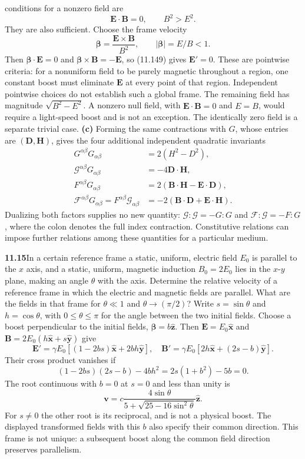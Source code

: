 conditions for a nonzero field are
\[
\boxed{\mathbf E\cdot\mathbf B=0,\qquad B^2>E^2.}
\]
They are also sufficient. Choose the frame velocity
\[
\boldsymbol\beta=\frac{\mathbf E\times\mathbf B}{B^2},
\qquad |\boldsymbol\beta|=E/B<1.
\]
Then $\boldsymbol\beta\cdot\mathbf E=0$ and
$\boldsymbol\beta\times\mathbf B=-\mathbf E$, so (11.149)
gives $\mathbf E'=0$.  These are pointwise criteria: for a
nonuniform field to be purely magnetic throughout a region, one
constant boost must eliminate $\mathbf E$ at every point of that
region.  Independent pointwise choices do not establish such a
global frame.  The remaining field has magnitude
$\sqrt{B^2-E^2}$. A nonzero null field, with
$\mathbf E\cdot\mathbf B=0$ and $E=B$, would require a light-speed
boost and is not an exception. The identically zero field is a
separate trivial case.
\textbf{(c)} Forming the same contractions with $G$, whose entries
are $(\mathbf D,\mathbf H)$, gives the four additional independent
quadratic invariants
\begin{align*}
G^{\alpha\beta}G_{\alpha\beta}&=2(H^2-D^2),\\
\mathcal G^{\alpha\beta}G_{\alpha\beta}&=-4\mathbf D\cdot\mathbf H,\\
F^{\alpha\beta}G_{\alpha\beta}&=2(\mathbf B\cdot\mathbf H-
\mathbf E\cdot\mathbf D),\\
\mathcal F^{\alpha\beta}G_{\alpha\beta}
=F^{\alpha\beta}\mathcal G_{\alpha\beta}
&=-2(\mathbf B\cdot\mathbf D+\mathbf E\cdot\mathbf H).
\end{align*}
Dualizing both factors supplies no new quantity:
$\mathcal G\!:\!\mathcal G=-G\!:\!G$ and
$\mathcal F\!:\!\mathcal G=-F\!:\!G$, where the colon denotes the
full index contraction. Constitutive relations can impose further
relations among these quantities for a particular medium.

\par\bigskip
\noindent\textbf{11.15}\quad In a certain reference frame a static, uniform, electric field $E_{0}$ is parallel to the $x$ axis, and a static, uniform, magnetic induction $B_{0}=2E_{0}$ lies in the $x$-$y$ plane, making an angle $\theta$ with the axis. Determine the relative velocity of a reference frame in which the electric and magnetic fields are parallel. What are the fields in that frame for $\theta\ll1$ and $\theta\to(\pi/2)$?
\solution
Write $s=\sin\theta$ and $h=\cos\theta$, with $0\leq\theta\leq\pi$
for the angle between the two initial fields. Choose a boost perpendicular to the initial fields, $\boldsymbol\beta=b\hat{\mathbf z}$.
Then $\mathbf E=E_0\hat{\mathbf x}$ and
$\mathbf B=2E_0(h\hat{\mathbf x}+s\hat{\mathbf y})$ give
\[
\mathbf E'=\gamma E_0[(1-2bs)\hat{\mathbf x}+2bh\hat{\mathbf y}],
\quad
\mathbf B'=\gamma E_0[2h\hat{\mathbf x}+(2s-b)\hat{\mathbf y}].
\]
Their cross product vanishes if
\[
(1-2bs)(2s-b)-4bh^2
=2s(1+b^2)-5b=0.
\]
The root continuous with $b=0$ at $s=0$ and less than unity is
\[
\boxed{\mathbf v=c\frac{4\sin\theta}
 {5+\sqrt{25-16\sin^2\theta}}\hat{\mathbf z}.}
\]
For $s\ne0$ the other root is its reciprocal, and is not a physical
boost. The displayed transformed fields with this $b$ also specify
their common direction. This frame is not unique: a subsequent
boost along the common field direction preserves parallelism.

